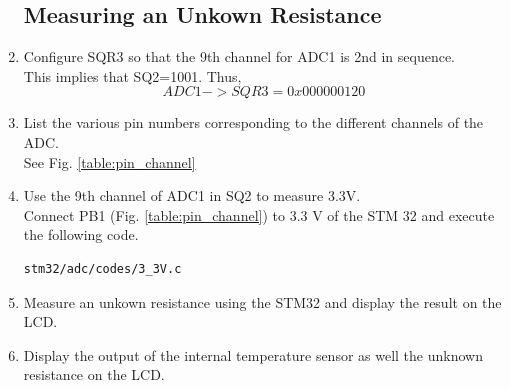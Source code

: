 \begin{enumerate}[label=\arabic*.,ref=\theenumi]
\subsection{Measuring an Unkown Resistance}
\item Configure SQR3 so that the 9th channel for ADC1 is 2nd in sequence.
\\
\solution This implies that SQ2=1001.  Thus,
\begin{equation}
ADC1->SQR3 = 0x000000120
\end{equation}
\item List the various pin numbers corresponding to the different channels of the ADC.
\\
\solution See Fig. \ref{table:pin_channel}

\item Use the 9th channel of  ADC1 in SQ2 to measure 3.3V. 
\\
\solution Connect PB1 (Fig. \ref{table:pin_channel}) to 3.3 V of the STM 32 and execute the following
code.
\begin{lstlisting}
stm32/adc/codes/3_3V.c
\end{lstlisting}
\item Measure an unkown resistance using the STM32 and display the result on the LCD.
\item Display the output of the internal temperature sensor as well the unknown resistance on the LCD.
\end{enumerate}

